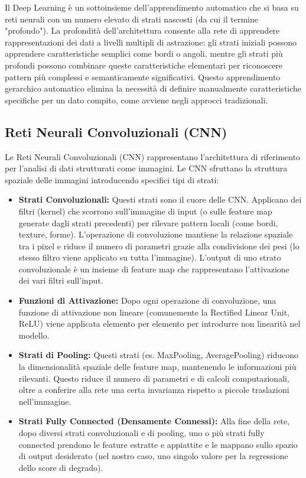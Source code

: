 Il Deep Learning è un sottoinsieme dell'apprendimento automatico che si basa su reti neurali con un numero elevato di strati nascosti (da cui il termine "profondo"). La profondità dell'architettura consente alla rete di apprendere rappresentazioni dei dati a livelli multipli di astrazione: gli strati iniziali possono apprendere caratteristiche semplici come bordi o angoli, mentre gli strati più profondi possono combinare queste caratteristiche elementari per riconoscere pattern più complessi e semanticamente significativi. Questo apprendimento gerarchico automatico elimina la necessità di definire manualmente caratteristiche specifiche per un dato compito, come avviene negli approcci tradizionali.

\subsection{Reti Neurali Convoluzionali (CNN)}

Le Reti Neurali Convoluzionali (CNN) rappresentano l'architettura di riferimento per l'analisi di dati strutturati come immagini. Le CNN sfruttano la struttura spaziale delle immagini introducendo specifici tipi di strati:
\begin{itemize}
    \item \textbf{Strati Convoluzionali:} Questi strati sono il cuore delle CNN. Applicano dei filtri (kernel) che scorrono sull'immagine di input (o sulle feature map generate dagli strati precedenti) per rilevare pattern locali (come bordi, texture, forme). L'operazione di convoluzione mantiene la relazione spaziale tra i pixel e riduce il numero di parametri grazie alla condivisione dei pesi (lo stesso filtro viene applicato su tutta l'immagine). L'output di uno strato convoluzionale è un insieme di feature map che rappresentano l'attivazione dei vari filtri sull'input.
    \item \textbf{Funzioni di Attivazione:} Dopo ogni operazione di convoluzione, una funzione di attivazione non lineare (comunemente la Rectified Linear Unit, ReLU) viene applicata elemento per elemento per introdurre non linearità nel modello.
    \item \textbf{Strati di Pooling:} Questi strati (es. MaxPooling, AveragePooling) riducono la dimensionalità spaziale delle feature map, mantenendo le informazioni più rilevanti. Questo riduce il numero di parametri e di calcoli computazionali, oltre a conferire alla rete una certa invarianza rispetto a piccole traslazioni nell'immagine.
    \item \textbf{Strati Fully Connected (Densamente Connessi):} Alla fine della rete, dopo diversi strati convoluzionali e di pooling, uno o più strati fully connected prendono le feature estratte e appiattite e le mappano sullo spazio di output desiderato (nel nostro caso, uno singolo valore per la regressione dello score di degrado).
\end{itemize}

